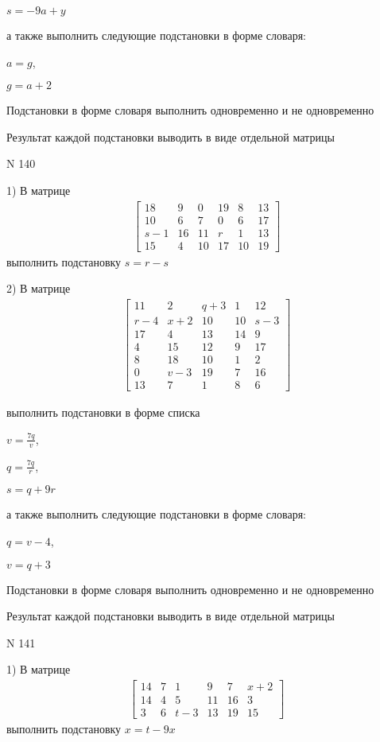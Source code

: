 \documentclass[11pt]{report}
\begin{document}
$s=- 9 a + y$

а также выполнить следующие подстановки в форме словаря:

$a=g$,

$g=a + 2$


    Подстановки в форме словаря выполнить одновременно и не одновременно


    Результат каждой подстановки выводить в виде отдельной матрицы

\newpage
N 140


    1) В матрице
\begin{align*}
\left[\begin{matrix}18 & 9 & 0 & 19 & 8 & 13\\10 & 6 & 7 & 0 & 6 & 17\\s - 1 & 16 & 11 & r & 1 & 13\\15 & 4 & 10 & 17 & 10 & 19\end{matrix}\right]
\end{align*}
выполнить подстановку $s=r - s$


    2) В матрице
\begin{align*}
\left[\begin{matrix}11 & 2 & q + 3 & 1 & 12\\r - 4 & x + 2 & 10 & 10 & s - 3\\17 & 4 & 13 & 14 & 9\\4 & 15 & 12 & 9 & 17\\8 & 18 & 10 & 1 & 2\\0 & v - 3 & 19 & 7 & 16\\13 & 7 & 1 & 8 & 6\end{matrix}\right]
\end{align*}

выполнить подстановки в форме списка

$v=\frac{7 q}{v}$,

$q=\frac{7 q}{r}$,

$s=q + 9 r$

а также выполнить следующие подстановки в форме словаря:

$q=v - 4$,

$v=q + 3$


    Подстановки в форме словаря выполнить одновременно и не одновременно


    Результат каждой подстановки выводить в виде отдельной матрицы

\newpage
N 141


    1) В матрице
\begin{align*}
\left[\begin{matrix}14 & 7 & 1 & 9 & 7 & x + 2\\14 & 4 & 5 & 11 & 16 & 3\\3 & 6 & t - 3 & 13 & 19 & 15\end{matrix}\right]
\end{align*}
выполнить подстановку $x=t - 9 x$
\end{document}
